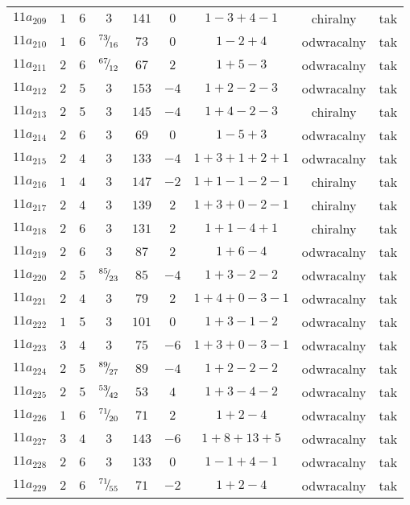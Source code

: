 \begin{longtable}{ccccccccc}
$11a_{209}$ & $1$ & $6$ & $3$ & $141$ & $0$ & $1-3+4-1$ & chiralny & tak \\
$11a_{210}$ & $1$ & $6$ & ${}^{73}{\mskip -5mu/\mskip -3mu}_{16}$ & $73$ & $0$ & $1-2+4$ & odwracalny & tak \\
$11a_{211}$ & $2$ & $6$ & ${}^{67}{\mskip -5mu/\mskip -3mu}_{12}$ & $67$ & $2$ & $1+5-3$ & odwracalny & tak \\
$11a_{212}$ & $2$ & $5$ & $3$ & $153$ & $-4$ & $1+2-2-3$ & odwracalny & tak \\
$11a_{213}$ & $2$ & $5$ & $3$ & $145$ & $-4$ & $1+4-2-3$ & chiralny & tak \\
$11a_{214}$ & $2$ & $6$ & $3$ & $69$ & $0$ & $1-5+3$ & odwracalny & tak \\
$11a_{215}$ & $2$ & $4$ & $3$ & $133$ & $-4$ & $1+3+1+2+1$ & odwracalny & tak \\
$11a_{216}$ & $1$ & $4$ & $3$ & $147$ & $-2$ & $1+1-1-2-1$ & chiralny & tak \\
$11a_{217}$ & $2$ & $4$ & $3$ & $139$ & $2$ & $1+3+0-2-1$ & chiralny & tak \\
$11a_{218}$ & $2$ & $6$ & $3$ & $131$ & $2$ & $1+1-4+1$ & chiralny & tak \\
$11a_{219}$ & $2$ & $6$ & $3$ & $87$ & $2$ & $1+6-4$ & odwracalny & tak \\
$11a_{220}$ & $2$ & $5$ & ${}^{85}{\mskip -5mu/\mskip -3mu}_{23}$ & $85$ & $-4$ & $1+3-2-2$ & odwracalny & tak \\
$11a_{221}$ & $2$ & $4$ & $3$ & $79$ & $2$ & $1+4+0-3-1$ & odwracalny & tak \\
$11a_{222}$ & $1$ & $5$ & $3$ & $101$ & $0$ & $1+3-1-2$ & odwracalny & tak \\
$11a_{223}$ & $3$ & $4$ & $3$ & $75$ & $-6$ & $1+3+0-3-1$ & odwracalny & tak \\
$11a_{224}$ & $2$ & $5$ & ${}^{89}{\mskip -5mu/\mskip -3mu}_{27}$ & $89$ & $-4$ & $1+2-2-2$ & odwracalny & tak \\
$11a_{225}$ & $2$ & $5$ & ${}^{53}{\mskip -5mu/\mskip -3mu}_{42}$ & $53$ & $4$ & $1+3-4-2$ & odwracalny & tak \\
$11a_{226}$ & $1$ & $6$ & ${}^{71}{\mskip -5mu/\mskip -3mu}_{20}$ & $71$ & $2$ & $1+2-4$ & odwracalny & tak \\
$11a_{227}$ & $3$ & $4$ & $3$ & $143$ & $-6$ & $1+8+13+5$ & odwracalny & tak \\
$11a_{228}$ & $2$ & $6$ & $3$ & $133$ & $0$ & $1-1+4-1$ & odwracalny & tak \\
$11a_{229}$ & $2$ & $6$ & ${}^{71}{\mskip -5mu/\mskip -3mu}_{55}$ & $71$ & $-2$ & $1+2-4$ & odwracalny & tak \\

\end{longtable}
